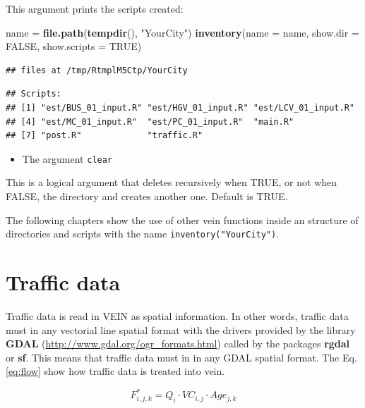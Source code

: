 \documentclass[12pt,graybox,envcountchap,sectrefs]{krantz}
\makeatletter
\newenvironment{Shaded}{\begin{snugshade}}{\end{snugshade}}
\newcommand{\KeywordTok}[1]{\textcolor[rgb]{0.13,0.29,0.53}{\textbf{#1}}}
\newcommand{\DataTypeTok}[1]{\textcolor[rgb]{0.13,0.29,0.53}{#1}}
\newcommand{\StringTok}[1]{\textcolor[rgb]{0.31,0.60,0.02}{#1}}
\newcommand{\OtherTok}[1]{\textcolor[rgb]{0.56,0.35,0.01}{#1}}
\newcommand{\NormalTok}[1]{#1}
\providecommand{\tightlist}{%
  \setlength{\itemsep}{0pt}\setlength{\parskip}{0pt}}
\newenvironment{kframe}{%
\medskip{}
\setlength{\fboxsep}{.8em}
 \def\at@end@of@kframe{}%
 \ifinner\ifhmode%
  \def\at@end@of@kframe{\end{minipage}}%
  \begin{minipage}{\columnwidth}%
 \fi\fi%
 \def\FrameCommand##1{\hskip\@totalleftmargin \hskip-\fboxsep
 \colorbox{shadecolor}{##1}\hskip-\fboxsep
     \hskip-\linewidth \hskip-\@totalleftmargin \hskip\columnwidth}%
 \MakeFramed {\advance\hsize-\width
   \@totalleftmargin\z@ \linewidth\hsize
   \@setminipage}}%
 {\par\unskip\endMakeFramed%
 \at@end@of@kframe}
\renewenvironment{Shaded}{\begin{kframe}}{\end{kframe}}
\theoremstyle{definition}
\theoremstyle{definition}
\theoremstyle{definition}
\theoremstyle{remark}
\makeatother
\begin{document}
This argument prints the scripts created:

\begin{Shaded}
\begin{Highlighting}[]
\NormalTok{name =}\StringTok{ }\KeywordTok{file.path}\NormalTok{(}\KeywordTok{tempdir}\NormalTok{(), }\StringTok{"YourCity"}\NormalTok{)}
\KeywordTok{inventory}\NormalTok{(}\DataTypeTok{name =}\NormalTok{ name, }\DataTypeTok{show.dir =} \OtherTok{FALSE}\NormalTok{, }\DataTypeTok{show.scripts =} \OtherTok{TRUE}\NormalTok{)}
\end{Highlighting}
\end{Shaded}

\begin{verbatim}
## files at /tmp/RtmplM5Ctp/YourCity
\end{verbatim}

\begin{verbatim}
## Scripts:
## [1] "est/BUS_01_input.R" "est/HGV_01_input.R" "est/LCV_01_input.R"
## [4] "est/MC_01_input.R"  "est/PC_01_input.R"  "main.R"            
## [7] "post.R"             "traffic.R"
\end{verbatim}

\begin{itemize}
\tightlist
\item
  The argument \texttt{clear}
\end{itemize}

This is a logical argument that deletes recursively when TRUE, or not
when FALSE, the directory and creates another one. Default is TRUE.

The following chapters show the use of other vein functions inside an
structure of directories and scripts with the name
\texttt{inventory("YourCity")}.

\chapter{Traffic data}\label{traffic}

Traffic data is read in VEIN as spatial information. In other words,
traffic data must in any vectorial line spatial format with the drivers
provided by the library \textbf{GDAL}
(\url{http://www.gdal.org/ogr_formats.html}) called by the packages
\textbf{rgdal} or \textbf{sf}. This means that traffic data must in in
any GDAL spatial format. The Eq. \eqref{eq:flow} show how traffic data is
treated into vein.

\begin{equation}
F^*_{i,j,k} = Q_{i} \cdot VC_{i,j} \cdot Age_{j,k}
\label{eq:flow}
\end{equation}
\end{document}
